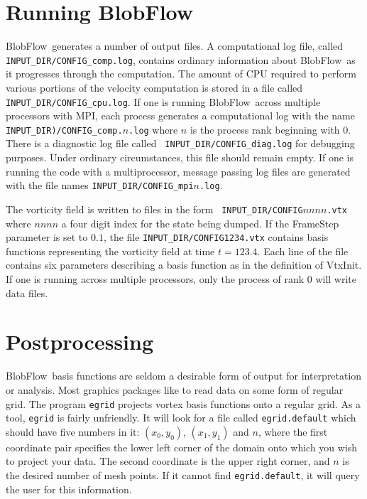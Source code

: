\documentclass[12pt]{report}
\newcommand{\BF}{BlobFlow}
\begin{document}
\section{Running \BF}

\BF~generates a number of output files.  A computational log file,
called {\tt INPUT\_DIR/CONFIG\_comp.log}, contains ordinary information about
\BF~as it progresses through the computation.  The amount of CPU required to
perform various portions of the velocity computation is stored in a file called
{\tt INPUT\_DIR/CONFIG\_cpu.log}. If one is running
\BF~across multiple processors with MPI, each process generates a computational
log with
the name {\tt INPUT\_DIR)/CONFIG\_comp.$n$.log} where $n$ is the process rank
beginning with 0.  There is a diagnostic log file called {\tt
INPUT\_DIR/CONFIG\_diag.log} for debugging purposes.  Under ordinary
circumstances, this file should remain empty.  If one is running the
code with a multiprocessor, message passing log files are generated with the
file names {\tt INPUT\_DIR/CONFIG\_mpi$n$.log}.

The vorticity field is written to files in the form {\tt
INPUT\_DIR/CONFIG$nnnn$.vtx} where $nnnn$ a four digit index for the state
being dumped.  If the FrameStep parameter is set to $0.1$, the file
{\tt INPUT\_DIR/CONFIG1234.vtx} contains basis functions representing the
vorticity field at time $t=123.4$.  Each line of the file contains six
parameters describing a basis function as in the definition of VtxInit.  
If one is running across multiple
processors, only the process of rank 0 will write data files.

\section{Postprocessing}

\BF~basis functions are seldom a desirable form of output for
interpretation or analysis.  Most graphics packages like to read data on
some form of regular grid.  The program {\tt egrid} projects 
vortex basis functions onto a regular
grid.  As a tool, {\tt egrid} is fairly unfriendly.  It will look for a file
called {\tt egrid.default} which should have five numbers in it:
$(x_0,y_0)$, $(x_1,y_1)$ and $n$, where the first coordinate pair specifies
the lower left corner of the domain onto which you wish to project your
data.  The second coordinate is the upper right corner, and $n$ is the
desired number of mesh points.  If it cannot find {\tt egrid.default}, it
will query the user for this information.
\end{document}
